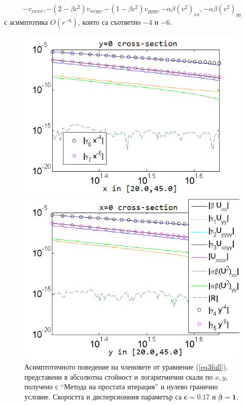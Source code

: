 \documentclass{article}
\newcommand{\rf}[1]{(\ref{#1})}
\begin{document}
$$
- v_{xxxx},  - (2-\beta c^2)v_{xxyy},  - (1-\beta c^2)v_{yyyy}, - \alpha \beta (v^2)_{xx}, - \alpha \beta (v^2)_{yy}
$$
с асимптотика $O(r^{-6})$, които са съответно $-4$ и $-6$.
\begin{figure}[ht]
	\begin{minipage}[b]{0.95\linewidth}
		\includegraphics[width=\linewidth]{AssymptForEachTerm/c017_bt1_5/ChristovIC_AlongX_50_ZB2_bt1_c017_h020_O(h^6).png}
	\end{minipage}
	\begin{minipage}[b]{0.95\linewidth}
		\includegraphics[width=\linewidth]{AssymptForEachTerm/c017_bt1_5/ChristovIC_AlongY_50_ZB2_bt1_c017_h020_O(h^6).png}
	\end{minipage}
	\caption{Асимптотичното поведение на членовете от уравнение \rf{eq3full}, представени в абсолютна стойност и логаритмични скали по $x,y$, получено с ``Метода на простата итерация'' и нулево гранично условие. Скоростта и дисперсионния параметър са $\boldsymbol{c=0.17}$ и $\boldsymbol{\beta = 1}$. }
	\label{fig:assympt_c017bt1}
\end{figure}
\end{document}
